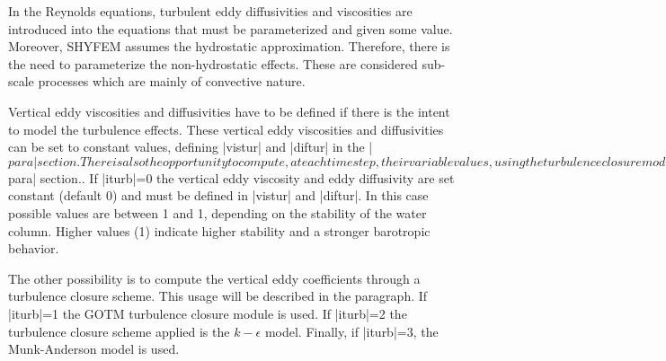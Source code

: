 
%
%
%
%
%
%
%

In the Reynolds equations, turbulent eddy diffusivities and viscosities are
introduced into the equations that must be parameterized and given some
value. Moreover, SHYFEM assumes the hydrostatic approximation. Therefore,
there is the need to parameterize the non-hydrostatic effects. These
are considered sub-scale processes which are mainly of convective nature.

Vertical eddy viscosities and diffusivities have to be defined if
there is the intent to model the turbulence effects.  These vertical
eddy viscosities and diffusivities can be set to constant values,
defining |vistur| and |diftur| in the |$para| section.  There is also
the opportunity to compute, at each timestep, their variable values,
using the turbulence closure module.

The parameter that has to be set in order to choose the turbulence
scheme is |iturb| in the |$para| section..  If |iturb|=0 the vertical
eddy viscosity and eddy diffusivity are set constant (default 0) and
must be defined in |vistur| and |diftur|. In this case possible values are between 1 and 1, depending on the
stability of the water column. Higher values (1) indicate higher
stability and a stronger barotropic behavior.

The other possibility is to compute the vertical eddy coefficients through
a turbulence closure scheme. This usage will be described in the paragraph.
If |iturb|=1 the GOTM turbulence closure module is used.
If |iturb|=2 the turbulence closure scheme applied is the $k-\epsilon$ model. 
Finally, if |iturb|=3, the Munk-Anderson model is used.

